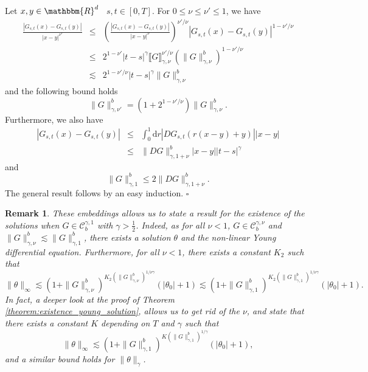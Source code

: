 \documentclass[a4paper,11pt]{article}
\newcommand{\mathd}{\mathrm{d}}
\newtheorem{remark}[theorem]{Remark}
\newenvironment{proof}{{\sc Proof.}}{\hfill$\square$}
\newcommand{\CC}{\mathscr C}
\begin{document}
\begin{proof}
  Let $x,y \in \mathbbm{R}^{d}$ \ $s,t \in [ 0,T ]$. For $0 \leqslant \nu
  \leqslant \nu' \leqslant 1$, we have
  \begin{eqnarray*}
    \frac{| G_{s,t} ( x ) -G_{s,t} ( y ) |}{| x-y |^{\nu'}} & \leqslant &
    \left( \frac{| G_{s,t} ( x ) -G_{s,t} ( y ) |}{| x-y |^{\nu}}
    \right)^{\nu' / \nu} | G_{s,t} ( x ) -G_{s,t} ( y ) |^{1- \nu' / \nu}\\
    & \leqslant & 2^{1- \nu'} | t-s |^{\gamma} \llbracket G
    \rrbracket_{\gamma , \nu}^{\nu' / \nu} ( \| G \|^{b}_{\gamma , \nu} )^{1-
    \nu' / \nu}\\
    & \lesssim & 2^{1- \nu' / \nu} | t-s |^{\gamma} \| G \|_{\gamma ,
    \nu}^{b}
  \end{eqnarray*}
  and the following bound holds
  \[ \| G \|_{\gamma , \nu'}^{b} = ( 1+2^{1- \nu' / \nu} ) \| G \|_{\gamma ,
     \nu}^{b} . \]
  Furthermore, we also have
  \begin{eqnarray*}
    | G_{s,t} ( x ) -G_{s,t} ( y ) | & \leqslant & \int_{0}^{1} \mathd r  | D
    G_{s,t} ( r ( x-y ) +y ) |   | x-y |\\
    & \leqslant & \| D G \|_{\gamma ,1+ \nu}^{b} | x-y | | t-s |^{\gamma}
  \end{eqnarray*}
  and
  \[ \| G \|^{b}_{\gamma ,1} \leqslant 2 \| D G \|_{\gamma ,1+ \nu}^{b} . \]
  The general result follows by an easy induction.
\end{proof}

\begin{remark}
  \label{remark:a_priori_bounds}These embeddings allows us to state a result
  for the existence of the solutions when $G \in \CC^{\gamma ,1}_{b}$ with
  $\gamma > \frac{1}{2}$. Indeed, as for all $\nu <1$, $G \in \CC^{\gamma ,
  \nu}_{b}$ and $\| G \|_{\gamma , \nu}^{b} \lesssim \| G \|^{b}_{\gamma ,1}$,
  there exists a solution $\theta$ and the non-linear Young differential
  equation. Furthermore, for all $\nu <1$, there exists a constant $K_{2}$
  such that
  \[ \| \theta \|_{\infty} \lesssim ( 1+ \| G \|_{\gamma , \nu}^{b} )^{K_{2}
     ( \| G \|^{b}_{\gamma , \nu} )^{1/ \nu \gamma}} ( | \theta_{0} | +1 )  
     \lesssim ( 1+ \| G \|_{\gamma ,1}^{b} )^{K_{2} ( \| G \|^{b}_{\gamma ,1}
     )^{1/ \nu \gamma}} ( | \theta_{0} | +1 ) . \]
  In fact, a deeper look at the proof of Theorem
  \ref{theorem:existence_young_solution}, allows us to get rid of the $\nu$,
  and state that there exists a constant $K$ depending on $T$ and $\gamma$
  such that
  \[ \| \theta \|_{\infty} \lesssim ( 1+ \| G \|_{\gamma ,1}^{b} )^{K ( \| G
     \|^{b}_{\gamma ,1} )^{1/ \gamma}} ( | \theta_{0} | +1 ) , \]
  and a similar bound holds for $\| \theta \|_{\gamma}$.
\end{remark}
\end{document}
